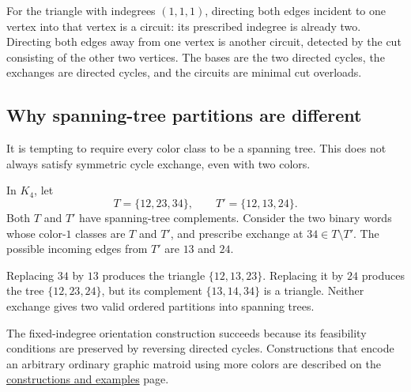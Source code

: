 For the triangle with indegrees $(1,1,1)$, directing both edges incident to
one vertex into that vertex is a circuit: its prescribed indegree is already
two. Directing both edges away from one vertex is another circuit, detected
by the cut consisting of the other two vertices. The bases are the two
directed cycles, the exchanges are directed cycles, and the circuits are
minimal cut overloads.

\subsection[treePartitions]{Why spanning-tree partitions are different}

It is tempting to require every color class to be a spanning tree. This does
not always satisfy symmetric cycle exchange, even with two colors.

\begin{example}
In $K_4$, let
\[
 T=\{12,23,34\},
 \qquad
 T'=\{12,13,24\}.
\]
Both $T$ and $T'$ have spanning-tree complements. Consider the two binary
words whose color-$1$ classes are $T$ and $T'$, and prescribe exchange at
$34\in T\setminus T'$. The possible incoming edges from $T'$ are $13$ and
$24$.

Replacing $34$ by $13$ produces the triangle $\{12,13,23\}$. Replacing it
by $24$ produces the tree $\{12,23,24\}$, but its complement
$\{13,14,34\}$ is a triangle. Neither exchange gives two valid ordered
partitions into spanning trees.
\end{example}

The fixed-indegree orientation construction succeeds because its feasibility
conditions are preserved by reversing directed cycles. Constructions that
encode an arbitrary ordinary graphic matroid using more colors are described
on the \href{constructions.htm}{constructions and examples} page.
